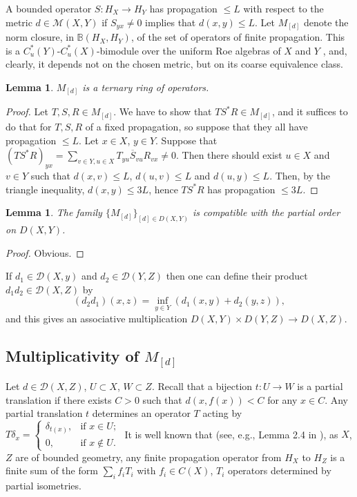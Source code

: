 \documentclass[12pt]{amsart}
\newtheorem{lem}[thm]{Lemma}
\theoremstyle{definition}
\begin{document}
A bounded operator $S:H_X\to H_Y$ has propagation $\leq L$ with respect to the metric $d\in\mathcal M(X,Y)$ if $S_{yx}\neq 0$ implies that $d(x,y)\leq L$. Let $M_{[d]}$ denote the norm closure, in $\mathbb B(H_X,H_Y)$, of the set of operators of finite propagation. This is a $C^*_u(Y)$-$C^*_u(X)$-bimodule over the uniform Roe algebras of $X$ and $Y$ \cite{M2}, and, clearly, it depends not on the chosen metric, but on its coarse equivalence class. 

\begin{lem}
$M_{[d]}$ is a ternary ring of operators.

\end{lem}
\begin{proof}
Let $T,S,R\in M_{[d]}$. We have to show that $TS^*R\in M_{[d]}$, and it suffices to do that for $T,S,R$ of a fixed propagation, so suppose that they all have propagation $\leq L$. Let $x\in X$, $y\in Y$. Suppose that $(TS^*R)_{yx}=\sum_{v\in Y,u\in X}T_{yu}\overline{S}_{vu}R_{vx}\neq 0$. Then there should exist $u\in X$ and $v\in Y$ such that $d(x,v)\leq L$, $d(u,v)\leq L$ and $d(u,y)\leq L$. Then, by the triangle inequality, $d(x,y)\leq 3L$, hence $TS^*R$ has propagation $\leq 3L$.
\end{proof}

\begin{lem}
The family $\{M_{[d]}\}_{[d]\in D(X,Y)}$ is compatible with the partial order on $D(X,Y)$.

\end{lem}
\begin{proof}
Obvious.
\end{proof} 

If $d_1\in\mathcal D(X,y)$ and $d_2\in\mathcal D(Y,Z)$ then one can define their product $d_1d_2\in\mathcal D(X,Z)$ by
\begin{equation}\label{eq:compos}
(d_2d_1)(x,z)=\inf_{y\in Y}(d_1(x,y)+d_2(y,z)),
\end{equation}
and this gives an associative multiplication $D(X,Y)\times D(Y,Z)\to D(X,Z)$. 


\subsection{Multiplicativity of $M_{[d]}$}%

Let $d\in\mathcal D(X,Z)$, $U\subset X$, $W\subset Z$. Recall that a bijection $t:U\to W$ is a partial translation \cite{Brodzki} if there exists $C>0$ such that $d(x,f(x))<C$ for any $x\in C$. Any partial translation $t$ determines an operator $T$ acting by $T\delta_x=\left\lbrace\begin{array}{cl}\delta_{t(x)},&\mbox{if\ }x\in U;\\0,&\mbox{if\ }x\notin U.\end{array}\right.$ It is well known that (see, e.g., Lemma 2.4 in \cite{Spakula-Willett}), as $X$, $Z$ are of bounded geometry, any finite propagation operator from $H_X$ to $H_Z$ is a finite sum of the form $\sum_i f_iT_i$ with $f_i\in C(X)$, $T_i$ operators determined by partial isometries. 
\end{document}
